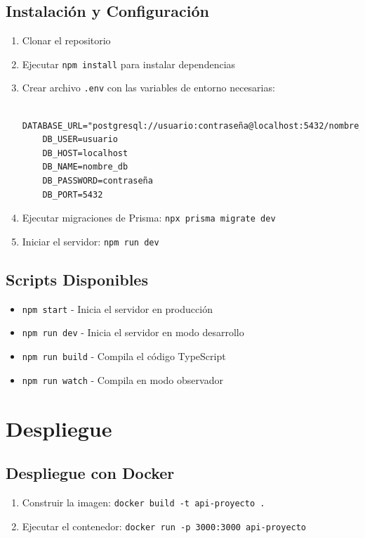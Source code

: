\documentclass{article}
\begin{document}
\subsection{Instalación y Configuración}
\begin{enumerate}
    \item Clonar el repositorio
    \item Ejecutar \texttt{npm install} para instalar dependencias
    \item Crear archivo \texttt{.env} con las variables de entorno necesarias:
    \begin{lstlisting}
    DATABASE_URL="postgresql://usuario:contraseña@localhost:5432/nombre_db"
    DB_USER=usuario
    DB_HOST=localhost
    DB_NAME=nombre_db
    DB_PASSWORD=contraseña
    DB_PORT=5432
    \end{lstlisting}
    \item Ejecutar migraciones de Prisma: \texttt{npx prisma migrate dev}
    \item Iniciar el servidor: \texttt{npm run dev}
\end{enumerate}

\subsection{Scripts Disponibles}
\begin{itemize}
    \item \texttt{npm start} - Inicia el servidor en producción
    \item \texttt{npm run dev} - Inicia el servidor en modo desarrollo
    \item \texttt{npm run build} - Compila el código TypeScript
    \item \texttt{npm run watch} - Compila en modo observador
\end{itemize}

\section{Despliegue}

\subsection{Despliegue con Docker}
\begin{enumerate}
    \item Construir la imagen: \texttt{docker build -t api-proyecto .}
    \item Ejecutar el contenedor: \texttt{docker run -p 3000:3000 api-proyecto}
\end{enumerate}
\end{document}
